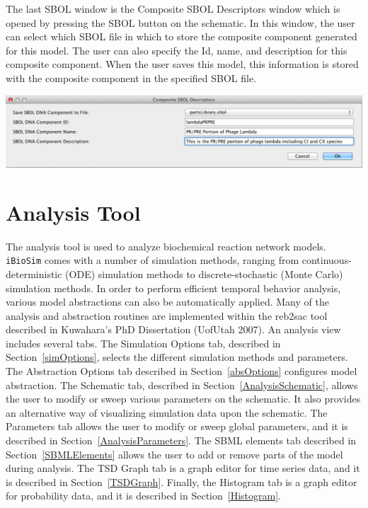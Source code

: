 \documentclass[titlepage,11pt]{article}
\begin{document}
The last SBOL window is the Composite SBOL Descriptors window which is opened by pressing the SBOL button on the schematic.  In this window, the user can select which SBOL file in which to store the composite component generated for this model.  The user can also specify the Id, name, and description for this composite component.  When the user saves this model, this information is stored with the composite component in the specified SBOL file.

\begin{center}
\includegraphics[width=160mm]{screenshots/SBOLbutton}
\end{center}

\clearpage

\section{\label{Analysis}Analysis Tool}

\noindent
The analysis tool is used to analyze biochemical reaction network models.  {\tt iBioSim} comes with a number of simulation methods, ranging from continuous-deterministic (ODE) simulation methods to discrete-stochastic (Monte Carlo) simulation methods.  In order to perform efficient temporal behavior analysis, various model abstractions can also be automatically applied.  Many of the analysis and abstraction routines are implemented
within the reb2sac tool described in 
Kuwahara's PhD Dissertation (UofUtah 2007).
  An analysis view includes several tabs.  The Simulation Options tab, described in Section~\ref{simOptions}, selects the different simulation methods and parameters.  The Abstraction Options tab described in Section~\ref{absOptions} configures model abstraction.  The Schematic tab, described in Section~\ref{AnalysisSchematic}, allows the user to modify or sweep various parameters on the schematic.  It also provides an alternative way of visualizing simulation data upon the schematic.  The Parameters tab allows the user to modify or sweep global parameters, and it is described in Section~\ref{AnalysisParameters}.  The SBML elements tab described in Section~\ref{SBMLElements} allows the user to add or remove parts of the model during analysis.  The TSD Graph tab is a graph editor for time series data, and it is described in Section~\ref{TSDGraph}.  Finally, the Histogram tab is a graph editor for probability data, and it is described in Section~\ref{Histogram}.
\end{document}
